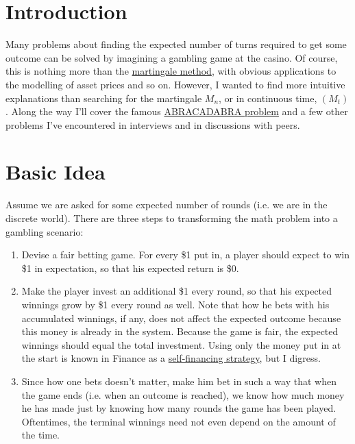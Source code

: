 \documentclass[11pt]{article}
\begin{document}
\section*{Introduction}
Many problems about finding the expected number of turns required to get some outcome can be solved by imagining a gambling game at the casino. Of course, this is nothing more than the \href{https://www.quantstart.com/articles/The-Markov-and-Martingale-Properties/}{martingale method}, with obvious applications to the modelling of asset prices and so on. 
However, I wanted to find more intuitive explanations than searching for the martingale $M_n$, or in continuous time, $(M_t)$. Along the way I'll cover the famous \href{https://martingalemeasure.wordpress.com/2014/02/02/monkey-typing-abracadabra-14/}{ABRACADABRA problem} and a few other problems I've encountered in interviews and in discussions with peers.

\tableofcontents
\newpage

\section{Basic Idea}
Assume we are asked for some expected number of rounds (i.e. we are in the discrete world). There are three steps to transforming the math problem into a gambling scenario:

\begin{enumerate}
\item Devise a fair betting game. For every \$1 put in, a player should expect to win \$1 in expectation, so that his expected return is \$0. 
\item Make the player invest an additional \$1 every round, so that his expected winnings grow by \$1 every round as well. Note that how he bets with his accumulated winnings, if any, does not affect the expected outcome because this money is already in the system. Because the game is fair, the expected winnings should equal the total investment. Using only the money put in at the start is known in Finance as a \href{https://math.stackexchange.com/questions/1828876/definition-of-self-financing-strategy}{self-financing strategy}, but I digress.
\item Since how one bets doesn't matter, make him bet in such a way that when the game ends (i.e. when an outcome is reached), we know how much money he has made just by knowing how many rounds the game has been played. Oftentimes, the terminal winnings need not even depend on the amount of the time.
\end{enumerate}
\end{document}
